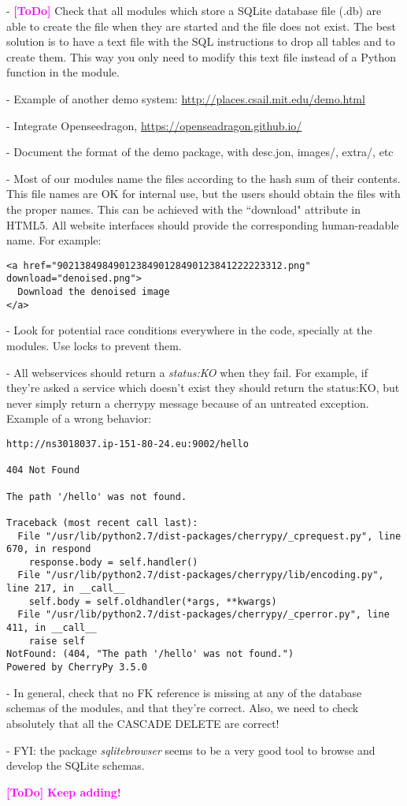 \documentclass[a4paper,12pt]{article}
\newcommand{\ToDo}[1]{\textcolor{magenta}{\textbf{[ToDo]} \textbf{#1}}}
\begin{document}
- \ToDo{} Check that all modules which store a SQLite database file (.db) are able to create the file when they are started and the file does not exist. The best solution is to have a text file with the SQL instructions to drop all  tables and to create them. This way you only need to modify this text file instead of a Python function in the module.

- Example of another demo system: \url{http://places.csail.mit.edu/demo.html}

- Integrate Openseedragon, \url{https://openseadragon.github.io/}

- Document the format of the demo package, with desc.jon, images/, extra/, etc

- Most of our modules name the files according to the hash sum of their contents. This file names are OK for internal use, but the users should obtain the files with the proper names. This can be achieved with the ``download" attribute in HTML5. All website interfaces should provide the corresponding human-readable name. For example:

\begin{verbatim}
<a href="9021384984901238490128490123841222223312.png" download="denoised.png">
  Download the denoised image
</a>
\end{verbatim}

- Look for potential race conditions everywhere in the code, specially at the modules. Use locks to prevent them.

- All webservices should return a \emph{status:KO} when they fail. For example, if they're asked a service which doesn't exist they should return the status:KO, but never simply return a cherrypy message because of an untreated exception. Example of a wrong behavior:

\begin{verbatim}
http://ns3018037.ip-151-80-24.eu:9002/hello

404 Not Found

The path '/hello' was not found.

Traceback (most recent call last):
  File "/usr/lib/python2.7/dist-packages/cherrypy/_cprequest.py", line 670, in respond
    response.body = self.handler()
  File "/usr/lib/python2.7/dist-packages/cherrypy/lib/encoding.py", line 217, in __call__
    self.body = self.oldhandler(*args, **kwargs)
  File "/usr/lib/python2.7/dist-packages/cherrypy/_cperror.py", line 411, in __call__
    raise self
NotFound: (404, "The path '/hello' was not found.")
Powered by CherryPy 3.5.0
\end{verbatim}

- In general, check that no FK reference is missing at any of the database schemas of the modules, and that they're correct.
Also, we need to check absolutely that all the CASCADE DELETE are correct!

- FYI: the package \emph{sqlitebrowser} seems to be a very good tool to browse and develop the SQLite schemas.

\ToDo{Keep adding!}




\end{document}
